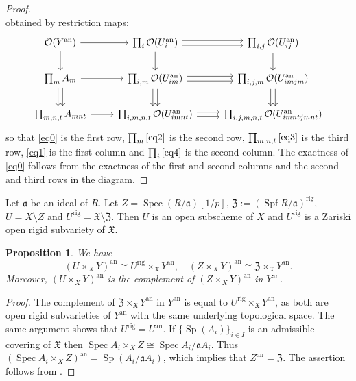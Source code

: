 \documentclass{amsart}
\newtheorem{prop}{Proposition}[section]
\theoremstyle{definition}
\theoremstyle{remark}
\DeclareMathOperator{\Spec}{Spec}
\DeclareMathOperator{\Sp}{Sp}
\newcommand{\OO}{\mathcal O}
\newcommand{\ana}{\mathrm{an}}
\DeclareMathOperator{\Spf}{Spf}
\newcommand{\rig}{\mathrm{rig}}
\begin{document}
\begin{proof}
\begin{equation}
\end{equation}
obtained by restriction maps:
\begin{equation}
\begin{tikzcd}
\OO(Y^{\ana})\arrow[r]\arrow[d] & \prod_{i} \OO(U_i^{\ana})\arrow[r, shift left]
        \arrow[r, shift right]\ar[d] & 
\prod_{i,j} \OO(U_{ij}^{\ana})\arrow[d] \\
\prod_m A_{m}\arrow[r]
\arrow[d, shift left]
        \arrow[d, shift right]& \prod_{i, m} \OO(U_{im}^{\ana})\arrow[r, shift left]
        \arrow[r, shift right]\arrow[d, shift left]
        \arrow[d, shift right]& \prod_{i,j,m} \OO(U_{imjm}^{\ana}) \arrow[d, shift left]
        \arrow[d, shift right]\\
        \prod_{m,n,t}A_{mnt}\arrow[r] &\prod_{i,m,n,t} \OO(U_{imnt}^{\ana})\arrow[r, shift left]
        \arrow[r, shift right]& \prod_{i,j,m,n,t} \OO(U_{imntjmnt}^{\ana})
  \end{tikzcd}
\end{equation}
so that \eqref{eq0} is the first row, $\prod_m \eqref{eq2}$ is the second row, $\prod_{m,n,t} \eqref{eq3}$ is the third row, \eqref{eq1} is the first column and $\prod_{i}\eqref{eq4}$ is the second column. The exactness of \eqref{eq0} follows from the exactness of the first and second columns and the second and third rows in the diagram. 
\end{proof}



Let $\mathfrak a$ be an ideal of $R$. Let $Z= \Spec (R/\mathfrak a)[1/p]$, $\mathfrak Z:=(\Spf R/\mathfrak a)^{\rig}$, $U=X\setminus Z$  and $U^{\rig}=\mathfrak X\setminus \mathfrak Z$. Then $U$ is an 
open subscheme of $X$ and $U^{\rig}$ is a Zariski open rigid subvariety 
of $\mathfrak X$. 
\begin{prop}\label{complement} We have 
\begin{equation}
(U\times_X Y)^{\ana}\cong U^{\rig}\times_{\mathfrak X} Y^{\ana}, \quad 
(Z\times_X Y)^{\ana}\cong \mathfrak Z \times_{\mathfrak X} Y^{\ana}.
\end{equation}
Moreover, $(U\times_X Y)^{\ana}$ is the complement of $(Z\times_X Y)^{\ana}$ in $Y^{\ana}$.
\end{prop}
\begin{proof} The complement of $\mathfrak Z \times_{\mathfrak X} Y^{\ana}$ in $Y^{\ana}$ is equal to $U^{\rig}\times_{\mathfrak X} Y^{\ana}$, as
both are open rigid subvarieties of $Y^{\ana}$ with the same underlying topological space. The same argument 
shows that $U^{\rig}=U^{\ana}$. 
If $\{\Sp(A_i)\}_{i\in I}$ is an admissible covering of $\mathfrak X$ 
then $\Spec A_i\times_X Z\cong \Spec A_i/\mathfrak a A_i$. Thus 
$(\Spec A_i\times_X Z)^{\ana}= \Sp(A_i/\mathfrak a A_i)$, which implies that $Z^{\ana}=\mathfrak Z$. The assertion follows from .
\end{proof}
\end{document}
